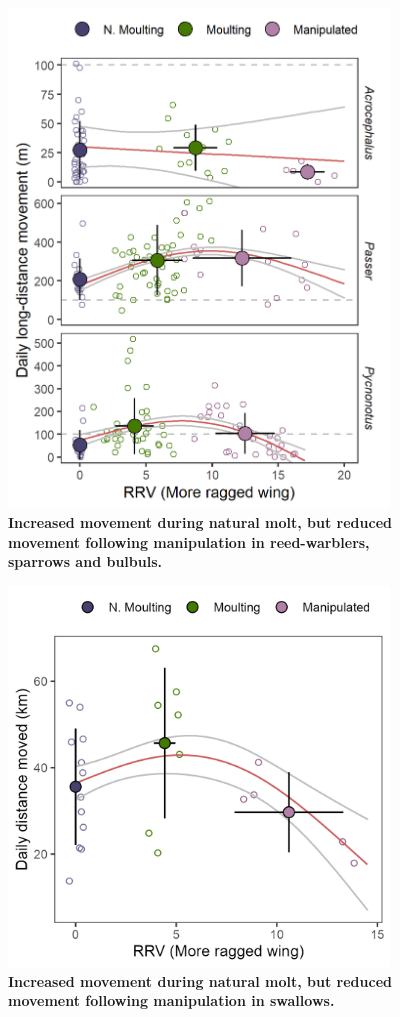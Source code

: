 \begin{refsection}
\begin{figure}[!h]
    \centering
    \includegraphics[width=0.9\textwidth]{figures/holeybirds/fig_01.png}
    \caption{
        \textbf{Increased movement during natural molt, but reduced movement following manipulation in reed-warblers, sparrows and bulbuls.}
    }\label{moult_fig_01}
\end{figure}

\begin{figure}[!h]
    \centering
    \includegraphics[width=0.9\textwidth]{figures/holeybirds/fig_02.png}
    \caption{
        \textbf{Increased movement during natural molt, but reduced movement following manipulation in swallows.}
    }\label{moult_fig_02}
    \end{figure}


\end{refsection}
